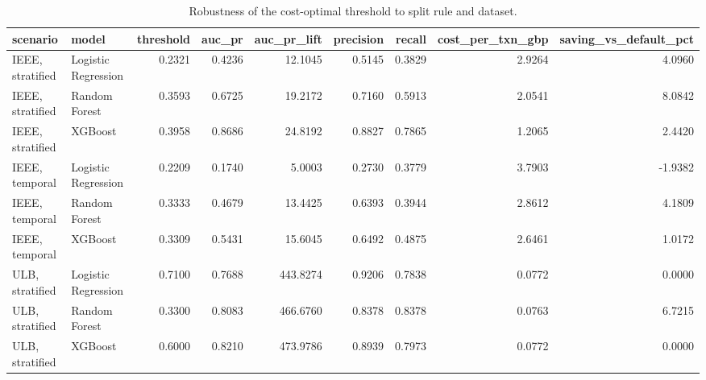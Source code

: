 \begin{table}
\caption{Robustness of the cost-optimal threshold to split rule and dataset.}
\label{tab:table3_robustness}
\begin{tabular}{llrrrrrrr}
\toprule
scenario & model & threshold & auc\_pr & auc\_pr\_lift & precision & recall & cost\_per\_txn\_gbp & saving\_vs\_default\_pct \\
\midrule
IEEE, stratified & Logistic Regression & 0.2321 & 0.4236 & 12.1045 & 0.5145 & 0.3829 & 2.9264 & 4.0960 \\
IEEE, stratified & Random Forest & 0.3593 & 0.6725 & 19.2172 & 0.7160 & 0.5913 & 2.0541 & 8.0842 \\
IEEE, stratified & XGBoost & 0.3958 & 0.8686 & 24.8192 & 0.8827 & 0.7865 & 1.2065 & 2.4420 \\
IEEE, temporal & Logistic Regression & 0.2209 & 0.1740 & 5.0003 & 0.2730 & 0.3779 & 3.7903 & -1.9382 \\
IEEE, temporal & Random Forest & 0.3333 & 0.4679 & 13.4425 & 0.6393 & 0.3944 & 2.8612 & 4.1809 \\
IEEE, temporal & XGBoost & 0.3309 & 0.5431 & 15.6045 & 0.6492 & 0.4875 & 2.6461 & 1.0172 \\
ULB, stratified & Logistic Regression & 0.7100 & 0.7688 & 443.8274 & 0.9206 & 0.7838 & 0.0772 & 0.0000 \\
ULB, stratified & Random Forest & 0.3300 & 0.8083 & 466.6760 & 0.8378 & 0.8378 & 0.0763 & 6.7215 \\
ULB, stratified & XGBoost & 0.6000 & 0.8210 & 473.9786 & 0.8939 & 0.7973 & 0.0772 & 0.0000 \\
\bottomrule
\end{tabular}
\end{table}
